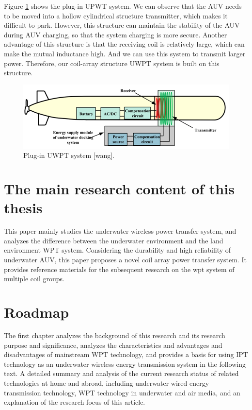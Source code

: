 Figure \ref{fig:plug in UWPT system} shows the plug-in UPWT system. We can observe that the AUV needs to be moved into a hollow cylindrical structure transmitter, which makes it difficult to park. However, this structure can maintain the stability of the AUV during AUV charging, so that the system charging is more secure. Another advantage of this structure is that the receiving coil is relatively large, which can make the mutual inductance high. And we can use this system to transmit larger power. Therefore, our coil-array structure UWPT system is built on this structure.
\begin{figure}[!t]
    \centering
    \includegraphics[width=0.7\linewidth]{images/1_plugin_UWPT_system.png}
    \caption{Plug-in UWPT system [wang].}
    \label{fig:plug in UWPT system}
\end{figure}


\section{The main research content of this thesis}
This paper mainly studies the underwater wireless power transfer system, and analyzes the difference between the underwater environment and the land environment WPT system. Considering the durability and high reliability of underwater AUV, this paper proposes a novel coil array power transfer system. 
It provides reference materials for the subsequent research on the wpt system of multiple coil groups.

\section{Roadmap}
The first chapter analyzes the background of this research and its research purpose and significance, analyzes the characteristics and advantages and disadvantages of mainstream WPT technology, and provides a basis for using IPT technology as an underwater wireless energy transmission system in the following text. A detailed summary and analysis of the current research status of related technologies at home and abroad, including underwater wired energy transmission technology, WPT technology in underwater and air media, and an explanation of the research focus of this article.

